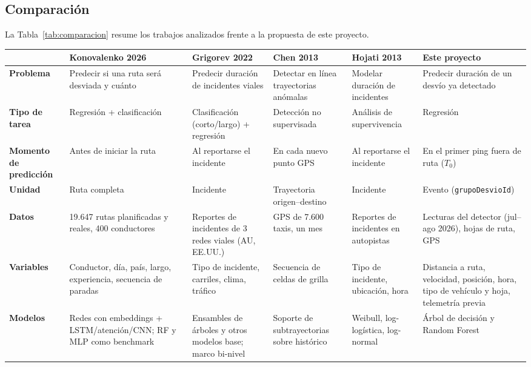 \documentclass[12pt, a4paper]{article}
\begin{document}
\subsection{Comparación}

La Tabla~\ref{tab:comparacion} resume los trabajos analizados frente a la
propuesta de este proyecto.

\begin{landscape}
\begin{table}[p]
  \centering
  \footnotesize
  \renewcommand{\arraystretch}{1.25}
  \begin{tabularx}{\linewidth}{>{\raggedright\arraybackslash}p{2.3cm} Y Y Y Y Y}
    \toprule
    & \textbf{Konovalenko 2026} & \textbf{Grigorev 2022} & \textbf{Chen 2013} & \textbf{Hojati 2013} & \textbf{Este proyecto} \\
    \midrule
    \textbf{Problema} & Predecir si una ruta será desviada y cuánto & Predecir duración de incidentes viales & Detectar en línea trayectorias anómalas & Modelar duración de incidentes & Predecir duración de un desvío ya detectado \\
    \textbf{Tipo de tarea} & Regresión + clasificación & Clasificación (corto/largo) + regresión & Detección no supervisada & Análisis de supervivencia & Regresión \\
    \textbf{Momento de predicción} & Antes de iniciar la ruta & Al reportarse el incidente & En cada nuevo punto GPS & Al reportarse el incidente & En el primer ping fuera de ruta ($T_0$) \\
    \textbf{Unidad} & Ruta completa & Incidente & Trayectoria origen--destino & Incidente & Evento (\texttt{grupoDesvioId}) \\
    \textbf{Datos} & 19.647 rutas planificadas y reales, 400 conductores & Reportes de incidentes de 3 redes viales (AU, EE.UU.) & GPS de 7.600 taxis, un mes & Reportes de incidentes en autopistas & Lecturas del detector (jul--ago 2026), hojas de ruta, GPS \\
    \textbf{Variables} & Conductor, día, país, largo, experiencia, secuencia de paradas & Tipo de incidente, carriles, clima, tráfico & Secuencia de celdas de grilla & Tipo de incidente, ubicación, hora & Distancia a ruta, velocidad, posición, hora, tipo de vehículo y hoja, telemetría previa \\
    \textbf{Modelos} & Redes con embeddings + LSTM/atención/CNN; RF y MLP como benchmark & Ensambles de árboles y otros modelos base; marco bi-nivel & Soporte de subtrayectorias sobre histórico & Weibull, log-logística, log-normal & Árbol de decisión y Random Forest \\

\end{tabularx}
\end{table}
\end{landscape}
\end{document}
